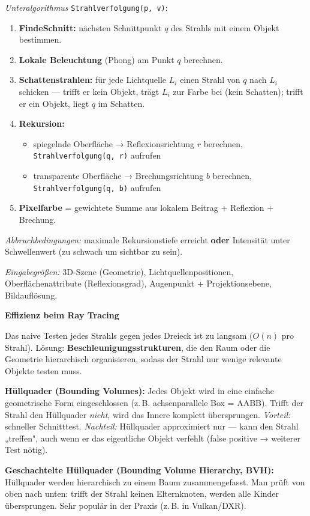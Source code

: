 \documentclass[12pt, a4paper]{article}
\begin{document}
\textit{Unteralgorithmus} \texttt{Strahlverfolgung(p, v)}:
\begin{enumerate}
  \item \textbf{FindeSchnitt:} nächsten Schnittpunkt $q$ des Strahls mit einem Objekt bestimmen.
  \item \textbf{Lokale Beleuchtung} (Phong) am Punkt $q$ berechnen.
  \item \textbf{Schattenstrahlen:} für jede Lichtquelle $L_i$ einen Strahl von $q$ nach $L_i$ schicken — trifft er kein Objekt, trägt $L_i$ zur Farbe bei (kein Schatten); trifft er ein Objekt, liegt $q$ im Schatten.
  \item \textbf{Rekursion:}
  \begin{itemize}
    \item spiegelnde Oberfläche → Reflexionsrichtung $r$ berechnen, \texttt{Strahlverfolgung(q, r)} aufrufen
    \item transparente Oberfläche → Brechungsrichtung $b$ berechnen, \texttt{Strahlverfolgung(q, b)} aufrufen
  \end{itemize}
  \item \textbf{Pixelfarbe} = gewichtete Summe aus lokalem Beitrag + Reflexion + Brechung.
\end{enumerate}

\textit{Abbruchbedingungen:} maximale Rekursionstiefe erreicht \textbf{oder} Intensität unter Schwellenwert (zu schwach um sichtbar zu sein).

\textit{Eingabegrößen:} 3D-Szene (Geometrie), Lichtquellenpositionen, Oberflächenattribute (Reflexionsgrad), Augenpunkt + Projektionsebene, Bildauflösung.

\medskip
\textbf{Effizienz beim Ray Tracing}

Das naive Testen jedes Strahls gegen jedes Dreieck ist zu langsam ($O(n)$ pro Strahl). Lösung: \textbf{Beschleunigungsstrukturen}, die den Raum oder die Geometrie hierarchisch organisieren, sodass der Strahl nur wenige relevante Objekte testen muss.

\textbf{Hüllquader (Bounding Volumes):} Jedes Objekt wird in eine einfache geometrische Form eingeschlossen (z.\,B. achsenparallele Box = AABB). Trifft der Strahl den Hüllquader \textit{nicht}, wird das Innere komplett übersprungen. \textit{Vorteil:} schneller Schnitttest. \textit{Nachteil:} Hüllquader approximiert nur — kann den Strahl „treffen", auch wenn er das eigentliche Objekt verfehlt (false positive → weiterer Test nötig).

\textbf{Geschachtelte Hüllquader (Bounding Volume Hierarchy, BVH):} Hüllquader werden hierarchisch zu einem Baum zusammengefasst. Man prüft von oben nach unten: trifft der Strahl keinen Elternknoten, werden alle Kinder übersprungen. Sehr populär in der Praxis (z.\,B. in Vulkan/DXR).
\end{document}
